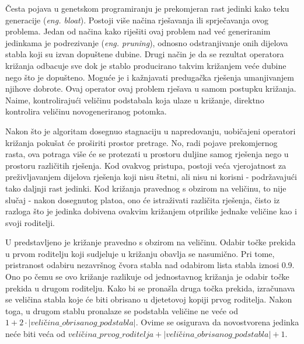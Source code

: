 Česta pojava u genetskom programiranju je prekomjeran rast jedinki kako teku generacije (\textit{eng. bloat}). Postoji više načina rješavanja ili sprječavanja ovog problema. Jedan od načina kako riješiti ovaj problem nad već generiranim jedinkama je podrezivanje (\textit{eng. pruning}), odnosno odstranjivanje onih dijelova stabla koji su izvan dopuštene dubine. Drugi način je da se rezultat operatora križanja odbacuje sve dok je stablo producirano takvim križanjem veće dubine nego što je dopušteno. Moguće je i kažnjavati predugačka rješenja umanjivanjem njihove dobrote. Ovaj operator ovaj problem rješava u samom postupku križanja. Naime, kontrolirajući veličinu podstabala koja ulaze u križanje, direktno kontrolira veličinu novogeneriranog potomka.

Nakon što je algoritam dosegnuo stagnaciju u napredovanju, uobičajeni operatori križanja pokušat će proširiti prostor pretrage. No, radi pojave prekomjernog rasta, ova potraga više će se protezati u prostoru duljine samog rješenja nego u prostoru različitih rješenja. Kod ovakvog pristupa, postoji veća vjerojatnost za preživljavanjem dijelova rješenja koji nisu štetni, ali nisu ni korisni - podržavajući tako daljnji rast jedinki. Kod križanja pravednog s obzirom na veličinu, to nije slučaj - nakon dosegnutog platoa, ono će istraživati različita rješenja, čisto iz razloga što je jedinka dobivena ovakvim križanjem otprilike jednake veličine kao i svoji roditelji.

U \cite{crxSizeFair} predstavljeno je križanje pravedno s obzirom na veličinu. Odabir točke prekida u prvom roditelju koji sudjeluje u križanju obavlja se nasumično. Pri tome, pristranost odabiru nezavršnog čvora stabla nad odabirom lista stabla iznosi 0.9. Ono po čemu se ovo križanje razlikuje od jednostavnog križanja je odabir točke prekida u drugom roditelju. Kako bi se pronašla druga točka prekida, izračunava se veličina stabla koje će biti obrisano u djetetovoj kopiji prvog roditelja. Nakon toga, u drugom stablu pronalaze se podstabla veličine ne veće od $1+2 \cdot |veličina\_obrisanog\_podstabla|$. Ovime se osigurava da novostvorena jedinka neće biti veća od $veličina\_prvog\_roditelja + |veličina\_obrisanog\_podstabla| + 1$.



